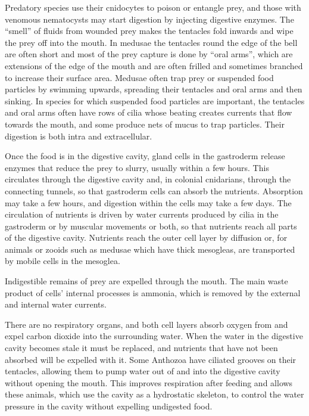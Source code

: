 Predatory species use their cnidocytes to poison or entangle prey, and those with venomous nematocysts may start digestion by injecting digestive enzymes. The ``smell'' of fluids from wounded prey makes the tentacles fold inwards and wipe the prey off into the mouth. In medusae the tentacles round the edge of the bell are often short and most of the prey capture is done by ``oral arms'', which are extensions of the edge of the mouth and are often frilled and sometimes branched to increase their surface area. Medusae often trap prey or suspended food particles by swimming upwards, spreading their tentacles and oral arms and then sinking. In species for which suspended food particles are important, the tentacles and oral arms often have rows of cilia whose beating creates currents that flow towards the mouth, and some produce nets of mucus to trap particles. Their digestion is both intra and extracellular.

Once the food is in the digestive cavity, gland cells in the gastroderm release enzymes that reduce the prey to slurry, usually within a few hours. This circulates through the digestive cavity and, in colonial cnidarians, through the connecting tunnels, so that gastroderm cells can absorb the nutrients. Absorption may take a few hours, and digestion within the cells may take a few days. The circulation of nutrients is driven by water currents produced by cilia in the gastroderm or by muscular movements or both, so that nutrients reach all parts of the digestive cavity. Nutrients reach the outer cell layer by diffusion or, for animals or zooids such as medusae which have thick mesogleas, are transported by mobile cells in the mesoglea.

Indigestible remains of prey are expelled through the mouth. The main waste product of cells' internal processes is ammonia, which is removed by the external and internal water currents.

There are no respiratory organs, and both cell layers absorb oxygen from and expel carbon dioxide into the surrounding water. When the water in the digestive cavity becomes stale it must be replaced, and nutrients that have not been absorbed will be expelled with it. Some Anthozoa have ciliated grooves on their tentacles, allowing them to pump water out of and into the digestive cavity without opening the mouth. This improves respiration after feeding and allows these animals, which use the cavity as a hydrostatic skeleton, to control the water pressure in the cavity without expelling undigested food.

